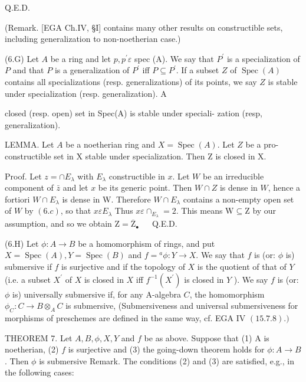 Q.E.D.

(Remark. [EGA Ch.IV, §I] contains many other results on constructible sets, including generalization to non-noetherian case.)

(6.G) Let $A$ be a ring and let $p, p^{\prime} \varepsilon$ spec (A). We say that $P^{\prime}$ is a specialization of $P$ and that $P$ is a generalization of $P^{\prime}$ iff $P \subseteq P^{\prime}$. If a subset $Z$ of $\operatorname{Spec}(A)$ contains all specializations (resp. generalizations) of its points, we say $Z$ is stable under specialization (resp. generalization). A

closed (resp. open) set in Spec(A) is stable under speciali- zation (resp, generalization).

LEMMA. Let $A$ be a noetherian ring and $X=\operatorname{Spec}(A)$. Let $Z$ be a pro-constructible set in $\mathrm{X}$ stable under specialization. Then $\mathrm{Z}$ is closed in $\mathrm{X}$.

Proof. Let $z=\cap E_{\lambda}$ with $E_{\lambda}$ constructible in $x$. Let $W$ be an irreducible component of $\bar{z}$ and let $x$ be its generic point. Then $W \cap Z$ is dense in $W$, hence a fortiori $W \cap E_{\lambda}$ is dense in W. Therefore $W \cap E_{\lambda}$ contains a non-empty open set of $W$ by $(6 . c)$, so that $x \varepsilon E_{\lambda}$ Thus $x \varepsilon \cap_{E_{\lambda}}=2$. This means $\mathrm{W} \subseteq \mathrm{Z}$ by our assumption, and so we obtain $\mathrm{Z}=\overline{\mathrm{Z}}_{\text {• }} \quad$ Q.E.D.

(6.H) Let $\phi: A \rightarrow B$ be a homomorphism of rings, and put $X=\operatorname{Spec}(A), Y=\operatorname{Spec}(B)$ and $f={ }^{a} \phi: Y \rightarrow X$. We say that $f$ is (or: $\phi$ is) submersive if $f$ is surjective and if the topology of $X$ is the quotient of that of $Y$ (i.e. a subset $X^{\prime}$ of $X$ is closed in $X$ iff $f^{-1}\left(X^{\prime}\right)$ is closed in $Y$ ). We say $f$ is (or: $\phi$ is) universally submersive if, for any A-algebra $C$, the homomorphism $\phi_{C}: C \rightarrow B \otimes_{A} C$ is submersive, (Submersiveness and universal submersiveness for morphisms of preschemes are defined in the same way, cf. EGA IV $(15.7 .8) .)$

THEOREM 7. Let $A, B, \phi, X, Y$ and $f$ be as above. Suppose that (1) A is noetherian, (2) $f$ is surjective and (3) the going-down theorem holds for $\phi: A \rightarrow B$. Then $\phi$ is submersive Remark. The conditions (2) and (3) are satisfied, e.g., in the following cases:

